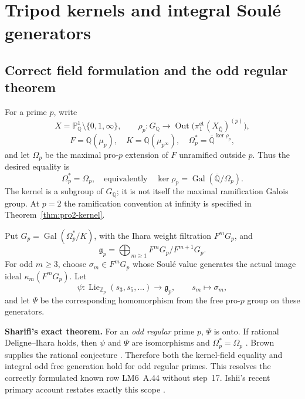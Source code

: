 \section{Tripod kernels and integral Soul\'e generators}
\label{sec:tripod-integral}

\subsection{Correct field formulation and the odd regular theorem}

For a prime $p$, write
\[
 X=\mathbb P^1_{\mathbb Q}\setminus\{0,1,\infty\},\qquad
 \rho_p:G_{\mathbb Q}\longrightarrow
 \operatorname{Out}\bigl(\pi_1^{\mathrm{et}}(X_{\overline{\mathbb Q}})^{(p)}\bigr),
\]
\[
 F=\mathbb Q(\mu_p),\quad K=\mathbb Q(\mu_{p^\infty}),\quad
 \Omega_p^*=\overline{\mathbb Q}^{\ker\rho_p},
\]
and let $\Omega_p$ be the maximal pro-$p$ extension of $F$ unramified outside $p$. Thus the desired equality is
\[
 \Omega_p^*=\Omega_p,
 \quad\text{equivalently}\quad
 \ker\rho_p=\operatorname{Gal}(\overline{\mathbb Q}/\Omega_p).
\]
The kernel is a subgroup of $G_{\mathbb Q}$; it is not itself the maximal ramification Galois group. At $p=2$ the ramification convention at infinity is specified in Theorem~\ref{thm:pro2-kernel}.

Put $G_p=\operatorname{Gal}(\Omega_p^*/K)$, with the Ihara weight filtration $F^mG_p$, and
\[
 \mathfrak g_p=\bigoplus_{m\geq1}F^mG_p/F^{m+1}G_p.
\]
For odd $m\geq3$, choose $\sigma_m\in F^mG_p$ whose Soul\'e value generates the actual image ideal $\kappa_m(F^mG_p)$. Let
\[
 \psi:\operatorname{Lie}_{\mathbb Z_p}(s_3,s_5,\ldots)
       \longrightarrow\mathfrak g_p,
 \qquad s_m\longmapsto\sigma_m,
\]
and let $\Psi$ be the corresponding homomorphism from the free pro-$p$ group on these generators.

\textbf{Sharifi's exact theorem.} For an \emph{odd regular} prime $p$, $\Psi$ is onto. If rational Deligne--Ihara holds, then $\psi$ and $\Psi$ are isomorphisms and $\Omega_p^*=\Omega_p$ \cite[Theorem~1.1, author's preprint p.~2]{Sharifi2002}. Brown supplies the rational conjecture \cite{Brown2012,Brown2019}. Therefore both the kernel-field equality and integral odd free generation hold for odd regular primes. This resolves the correctly formulated known row LM6~A.44 without step~17. Ishii's recent primary account restates exactly this scope \cite[Theorem~1.1 and Remark~1.1.1, p.~2]{IshiiKernel2026}.



